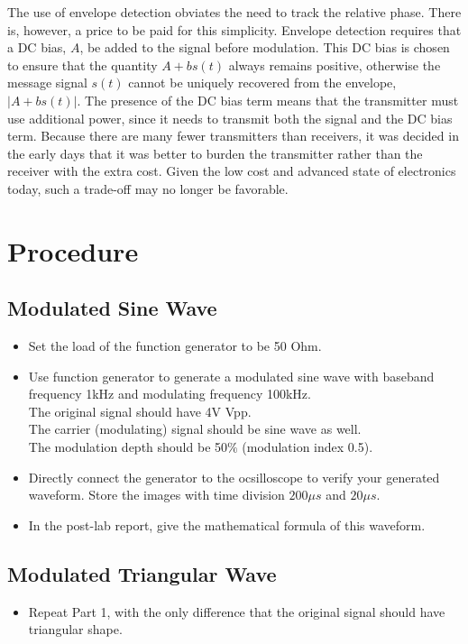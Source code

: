 \documentclass{article}
\begin{document}
The use of envelope detection obviates the need to track the relative phase. There is, however, a price to be paid for this simplicity. Envelope detection requires that a DC bias, $A$, be added to the signal before modulation. This DC bias is chosen to ensure that the quantity $A + bs(t)$ always remains positive, otherwise the message signal $s(t)$ cannot be uniquely recovered from the envelope, $| A + bs(t) |$. The presence of the DC bias term means that the transmitter must use additional power, since it needs to transmit both the signal and the DC bias term. Because there are many fewer transmitters than receivers, it was decided in the early days that it was better to burden the transmitter rather than the receiver with the extra cost. Given the low cost and advanced state of electronics today, such a trade-off may no longer be favorable.\\

\section{Procedure}
\subsection{Modulated Sine Wave}
\begin{itemize}
\item Set the load of the function generator to be 50 Ohm.
\item Use function generator to generate a modulated sine wave with baseband frequency 1kHz and modulating frequency 100kHz.\\
The original signal should have 4V Vpp.\\
The carrier (modulating) signal should be sine wave as well.\\
The modulation depth should be 50$\%$ (modulation index 0.5).
\item Directly connect the generator to the ocsilloscope to verify your generated waveform. Store the images with time division $200\mu s$ and $20\mu s$.
\item In the post-lab report, give the mathematical formula of this waveform.
\end{itemize}

\subsection{Modulated Triangular Wave}
\begin{itemize}
\item Repeat Part 1, with the only difference that the original signal should have triangular shape.
\end{itemize}
\end{document}
